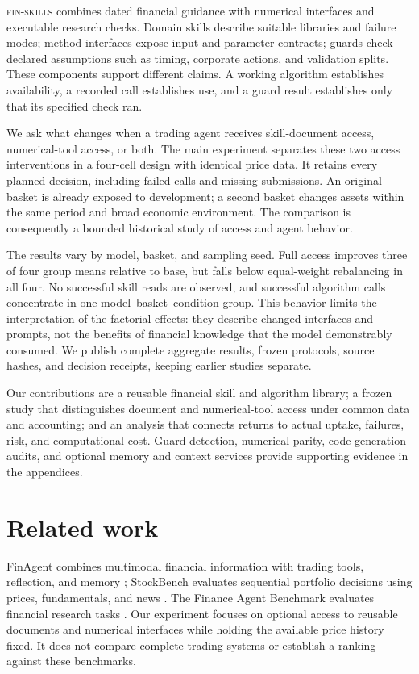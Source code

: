 \documentclass[11pt]{article}
\begin{document}
\textsc{fin-skills} combines dated financial guidance with numerical interfaces and
executable research checks. Domain skills describe suitable libraries and failure modes;
method interfaces expose input and parameter contracts; guards check declared assumptions
such as timing, corporate actions, and validation splits. These components support different
claims. A working algorithm establishes availability, a recorded call establishes use,
and a guard result establishes only that its specified check ran.

We ask what changes when a trading agent receives skill-document access, numerical-tool
access, or both. The main experiment separates these two access interventions in a
four-cell design with identical price data. It retains every planned decision, including
failed calls and missing submissions. An original basket is already exposed to development;
a second basket changes assets within the same period and broad economic environment.
The comparison is consequently a bounded historical study of access and agent behavior.

The results vary by model, basket, and sampling seed. Full access improves three of four
group means relative to base, but falls below equal-weight rebalancing in all four. No
successful skill reads are observed, and successful algorithm calls concentrate in one
model--basket--condition group. This behavior limits the interpretation of the factorial
effects: they describe changed interfaces and prompts, not the benefits of financial
knowledge that the model demonstrably consumed. We publish complete aggregate results,
frozen protocols, source hashes, and decision receipts, keeping earlier studies separate.

Our contributions are a reusable financial skill and algorithm library; a frozen study
that distinguishes document and numerical-tool access under common data and accounting;
and an analysis that connects returns to actual uptake, failures, risk, and computational
cost. Guard detection, numerical parity, code-generation audits, and optional memory and
context services provide supporting evidence in the appendices.

\section{Related work}
FinAgent combines multimodal financial information with trading tools, reflection, and
memory \cite{zhang2024finagent}; StockBench evaluates sequential portfolio decisions
using prices, fundamentals, and news \cite{chen2025stockbench}. The Finance Agent
Benchmark evaluates financial research tasks \cite{bigeard2025finance}. Our experiment
focuses on optional access to reusable documents and numerical interfaces while holding
the available price history fixed. It does not compare complete trading systems or
establish a ranking against these benchmarks.
\end{document}
